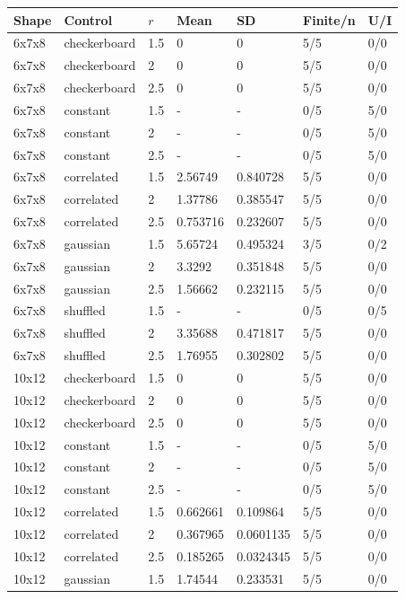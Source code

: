 \documentclass[
  english,
  11pt,
]{article}
\newcounter{none} %
\begin{document}
{\def\LTcaptype{none} %
\begin{longtable}[]{@{}lllllll@{}}
\toprule\noalign{}
Shape & Control & \(r\) & Mean & SD & Finite/n & U/I \\
\midrule\noalign{}
\endhead
\bottomrule\noalign{}
\endlastfoot
6x7x8 & checkerboard & 1.5 & 0 & 0 & 5/5 & 0/0 \\
6x7x8 & checkerboard & 2 & 0 & 0 & 5/5 & 0/0 \\
6x7x8 & checkerboard & 2.5 & 0 & 0 & 5/5 & 0/0 \\
6x7x8 & constant & 1.5 & - & - & 0/5 & 5/0 \\
6x7x8 & constant & 2 & - & - & 0/5 & 5/0 \\
6x7x8 & constant & 2.5 & - & - & 0/5 & 5/0 \\
6x7x8 & correlated & 1.5 & 2.56749 & 0.840728 & 5/5 & 0/0 \\
6x7x8 & correlated & 2 & 1.37786 & 0.385547 & 5/5 & 0/0 \\
6x7x8 & correlated & 2.5 & 0.753716 & 0.232607 & 5/5 & 0/0 \\
6x7x8 & gaussian & 1.5 & 5.65724 & 0.495324 & 3/5 & 0/2 \\
6x7x8 & gaussian & 2 & 3.3292 & 0.351848 & 5/5 & 0/0 \\
6x7x8 & gaussian & 2.5 & 1.56662 & 0.232115 & 5/5 & 0/0 \\
6x7x8 & shuffled & 1.5 & - & - & 0/5 & 0/5 \\
6x7x8 & shuffled & 2 & 3.35688 & 0.471817 & 5/5 & 0/0 \\
6x7x8 & shuffled & 2.5 & 1.76955 & 0.302802 & 5/5 & 0/0 \\
10x12 & checkerboard & 1.5 & 0 & 0 & 5/5 & 0/0 \\
10x12 & checkerboard & 2 & 0 & 0 & 5/5 & 0/0 \\
10x12 & checkerboard & 2.5 & 0 & 0 & 5/5 & 0/0 \\
10x12 & constant & 1.5 & - & - & 0/5 & 5/0 \\
10x12 & constant & 2 & - & - & 0/5 & 5/0 \\
10x12 & constant & 2.5 & - & - & 0/5 & 5/0 \\
10x12 & correlated & 1.5 & 0.662661 & 0.109864 & 5/5 & 0/0 \\
10x12 & correlated & 2 & 0.367965 & 0.0601135 & 5/5 & 0/0 \\
10x12 & correlated & 2.5 & 0.185265 & 0.0324345 & 5/5 & 0/0 \\
10x12 & gaussian & 1.5 & 1.74544 & 0.233531 & 5/5 & 0/0 \\

\end{longtable}}
\end{document}

